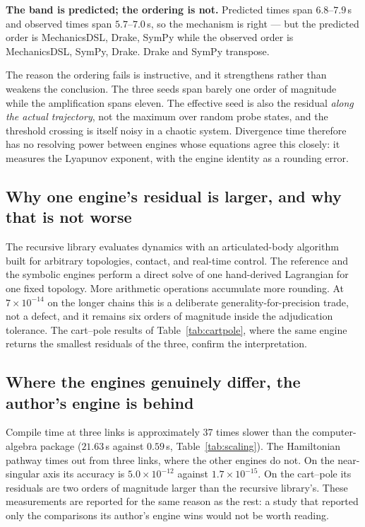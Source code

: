 \documentclass[review,12pt]{elsarticle}
\begin{document}
\noindent \textbf{The band is predicted; the ordering is not.} Predicted times
span $6.8$--$7.9$\,s and observed times span $5.7$--$7.0$\,s, so the mechanism
is right --- but the predicted order is MechanicsDSL, Drake, SymPy while the
observed order is MechanicsDSL, SymPy, Drake. Drake and SymPy transpose.

The reason the ordering fails is instructive, and it strengthens rather than
weakens the conclusion. The three seeds span barely one order of magnitude while
the amplification spans eleven. The effective seed is also the residual
\emph{along the actual trajectory}, not the maximum over random probe states,
and the threshold crossing is itself noisy in a chaotic system. Divergence time
therefore has no resolving power between engines whose equations agree this
closely: it measures the Lyapunov exponent, with the engine identity as a
rounding error.

\subsection{Why one engine's residual is larger, and why that is not worse}
The recursive library evaluates dynamics with an articulated-body algorithm
built for arbitrary topologies, contact, and real-time control. The reference
and the symbolic engines perform a direct solve of one hand-derived Lagrangian
for one fixed topology. More arithmetic operations accumulate more rounding. At
$7\times10^{-14}$ on the longer chains this is a deliberate
generality-for-precision trade, not a defect, and it remains six orders of
magnitude inside the adjudication tolerance. The cart--pole results of
Table~\ref{tab:cartpole}, where the same engine returns the smallest residuals
of the three, confirm the interpretation.

\subsection{Where the engines genuinely differ, the author's engine is behind}
\label{sec:behind}
Compile time at three links is approximately 37 times slower than the
computer-algebra package ($21.63$\,s against $0.59$\,s, Table~\ref{tab:scaling}).
The Hamiltonian pathway times out from three links, where the other engines do
not. On the near-singular axis its accuracy is $5.0\times10^{-12}$ against
$1.7\times10^{-15}$. On the cart--pole its residuals are two orders of magnitude
larger than the recursive library's. These measurements are reported for the
same reason as the rest: a study that reported only the comparisons its author's
engine wins would not be worth reading.
\end{document}
